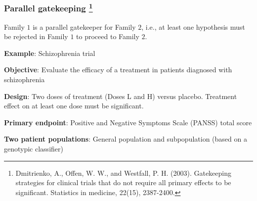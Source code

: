 \documentclass[xcolor={pdftex,dvipsnames,table}]{beamer}
\newcommand{\rbf}[1]{\textcolor{redUnipd}{ #1}}
\begin{document}
\begin{frame}

\end{frame}

\begin{frame}
\frametitle{Parallel gatekeeping \footnote{Dmitrienko, A., Offen, W. W., and Westfall, P. H. (2003). Gatekeeping strategies for clinical trials that do not require all primary effects to be significant. Statistics in medicine, 22(15), 2387-2400.}}

Family $1$ is a \rbf{parallel gatekeeper} for Family $2$, i.e., at least one hypothesis must be rejected in Family $1$ to proceed to Family $2$.

\bigskip

\rbf{\textbf{Example}}: Schizophrenia trial

\textbf{Objective}: Evaluate the efficacy of a treatment in patients diagnosed with schizophrenia

\textbf{Design}: Two doses of treatment (Doses L and H) versus placebo. Treatment effect on at least one dose must be
significant.

\textbf{Primary endpoint}: Positive and Negative Symptoms Scale (PANSS) total score

\textbf{Two patient populations}: General population and subpopulation (based on a genotypic classifier)
\end{frame}
\end{document}
